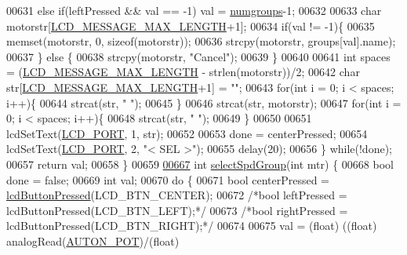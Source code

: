 \begin{DoxyCode}
{{{{{{{{{{00631         \textcolor{keywordflow}{else} \textcolor{keywordflow}{if}(leftPressed && val == -1) val = \hyperlink{lcddiag_8c_a205f1cedec1664555276e0a71a1c87d8}{numgroups}-1;
00632 
00633         \textcolor{keywordtype}{char} motorstr[\hyperlink{lcdmsg_8h_abe4c4b70fc6f44ae3680e5b2c68cdd00}{LCD\_MESSAGE\_MAX\_LENGTH}+1];
00634         \textcolor{keywordflow}{if}(val != -1)\{
00635             memset(motorstr, 0, \textcolor{keyword}{sizeof}(motorstr));
00636             strcpy(motorstr, groups[val].name);
00637         \} \textcolor{keywordflow}{else} \{
00638             strcpy(motorstr, \textcolor{stringliteral}{"Cancel"});
00639         \}
00640 
00641         \textcolor{keywordtype}{int} spaces = (\hyperlink{lcdmsg_8h_abe4c4b70fc6f44ae3680e5b2c68cdd00}{LCD\_MESSAGE\_MAX\_LENGTH} - strlen(motorstr))/2;
00642         \textcolor{keywordtype}{char} str[\hyperlink{lcdmsg_8h_abe4c4b70fc6f44ae3680e5b2c68cdd00}{LCD\_MESSAGE\_MAX\_LENGTH}+1] = \textcolor{stringliteral}{""};
00643         \textcolor{keywordflow}{for}(\textcolor{keywordtype}{int} i = 0; i < spaces; i++)\{
00644             strcat(str, \textcolor{stringliteral}{" "});
00645         \}
00646         strcat(str, motorstr);
00647         \textcolor{keywordflow}{for}(\textcolor{keywordtype}{int} i = 0; i < spaces; i++)\{
00648             strcat(str, \textcolor{stringliteral}{" "});
00649         \}
00650 
00651         lcdSetText(\hyperlink{lcdmsg_8h_abcf42bd88b3c36193f301ca25b033875}{LCD\_PORT}, 1, str);
00652 
00653         done = centerPressed;
00654         lcdSetText(\hyperlink{lcdmsg_8h_abcf42bd88b3c36193f301ca25b033875}{LCD\_PORT}, 2, \textcolor{stringliteral}{"<      SEL     >"});
00655         delay(20);
00656     \} \textcolor{keywordflow}{while}(!done);
00657     \textcolor{keywordflow}{return} val;
00658 \}
00659 
\hypertarget{lcddiag_8c_source.tex_l00667}{}\hyperlink{lcddiag_8c_a7a421f9cf3e21c806080bee51c68a5c9}{00667} \textcolor{keywordtype}{int} \hyperlink{lcddiag_8c_a7a421f9cf3e21c806080bee51c68a5c9}{selectSpdGroup}(\textcolor{keywordtype}{int} mtr) \{
00668     \textcolor{keywordtype}{bool} done = \textcolor{keyword}{false};
00669     \textcolor{keywordtype}{int} val;
00670     \textcolor{keywordflow}{do} \{
00671         \textcolor{keywordtype}{bool} centerPressed = \hyperlink{lcddiag_8h_a74e4c744db49f9b7b645095575e152ad}{lcdButtonPressed}(LCD\_BTN\_CENTER);
00672         \textcolor{comment}{/*bool leftPressed = lcdButtonPressed(LCD\_BTN\_LEFT);*/}
00673         \textcolor{comment}{/*bool rightPressed = lcdButtonPressed(LCD\_BTN\_RIGHT);*/}
00674 
00675         val = (float) ((\textcolor{keywordtype}{float}) analogRead(\hyperlink{autonrecorder_8h_a2490cda7a399f481333af2e5589b74a9}{AUTON\_POT})/(float) 
}}}}}}}}}}
\end{DoxyCode}
